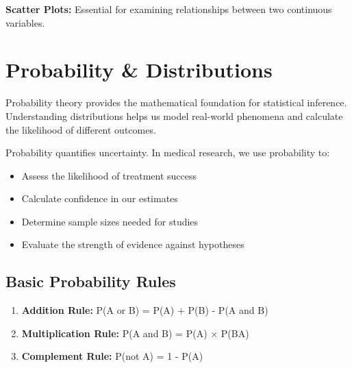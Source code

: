\documentclass[
  11pt,
  letterpaper,
  oneside]{book}
\providecommand{\tightlist}{%
  \setlength{\itemsep}{0pt}\setlength{\parskip}{0pt}}\usepackage{longtable,booktabs,array}
\begin{document}
\textbf{Scatter Plots:} Essential for examining relationships between
two continuous variables.

\section{Probability \& Distributions}\label{probability-distributions}

Probability theory provides the mathematical foundation for statistical
inference. Understanding distributions helps us model real-world
phenomena and calculate the likelihood of different outcomes.

\begin{tcolorbox}[enhanced jigsaw, toprule=.15mm, left=2mm, opacitybacktitle=0.6, colframe=quarto-callout-note-color-frame, leftrule=.75mm, titlerule=0mm, coltitle=black, colbacktitle=quarto-callout-note-color!10!white, toptitle=1mm, title=\textcolor{quarto-callout-note-color}{\faInfo}\hspace{0.5em}{What is Probability?}, bottomtitle=1mm, arc=.35mm, rightrule=.15mm, bottomrule=.15mm, breakable, opacityback=0, colback=white]

Probability quantifies uncertainty. In medical research, we use
probability to:

\begin{itemize}
\tightlist
\item
  Assess the likelihood of treatment success
\item
  Calculate confidence in our estimates
\item
  Determine sample sizes needed for studies
\item
  Evaluate the strength of evidence against hypotheses
\end{itemize}

\end{tcolorbox}

\subsection{Basic Probability Rules}\label{basic-probability-rules}

\begin{enumerate}
\def\labelenumi{\arabic{enumi}.}
\tightlist
\item
  \textbf{Addition Rule:} P(A or B) = P(A) + P(B) - P(A and B)
\item
  \textbf{Multiplication Rule:} P(A and B) = P(A) × P(B\textbar A)
\item
  \textbf{Complement Rule:} P(not A) = 1 - P(A)
\end{enumerate}
\end{document}
